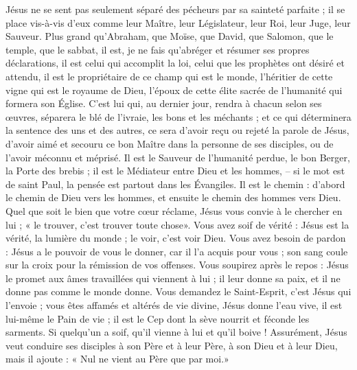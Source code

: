 Jésus ne se sent pas seulement séparé des pécheurs par sa sainteté parfaite ; il se place vis-à-vis d’eux comme leur Maître, leur Législateur, leur Roi, leur Juge, leur Sauveur. Plus grand qu’Abraham, que Moïse, que David, que Salomon, que le temple, que le sabbat, il est, je ne fais qu’abréger et résumer ses propres déclarations, il est celui qui accomplit la loi, celui que les prophètes ont désiré et attendu, il est le propriétaire de ce champ qui est le monde, l’héritier de cette vigne qui est le royaume de Dieu, l’époux de cette élite sacrée de l’humanité qui formera son Église. C’est lui qui, au dernier jour, rendra à chacun selon ses œuvres, séparera le blé de l’ivraie, les bons et les méchants ; et ce qui déterminera la sentence des uns et des autres, ce sera d’avoir reçu ou rejeté la parole de Jésus, d’avoir aimé et secouru ce bon Maître dans la personne de ses disciples, ou de l’avoir méconnu et méprisé. Il est le Sauveur de l’humanité perdue, le bon Berger, la Porte des brebis ; il est le Médiateur entre Dieu et les hommes, – si le mot est de saint Paul, la pensée est partout dans les Évangiles. Il est le chemin : d’abord le chemin de Dieu vers les hommes, et ensuite le chemin des hommes vers Dieu. Quel que soit le bien que votre cœur réclame, Jésus vous convie à le chercher en lui ; « le trouver, c’est trouver toute chose». Vous avez soif de vérité : Jésus est la vérité, la lumière du monde ; le voir, c’est voir Dieu. Vous avez besoin de pardon : Jésus a le pouvoir de vous le donner, car il l’a acquis pour vous ; son sang coule sur la croix pour la rémission de vos offenses. Vous soupirez après le repos : Jésus le promet aux âmes travaillées qui viennent à lui ; il leur donne sa paix, et il ne donne pas comme le monde donne. Vous demandez le Saint-Esprit, c’est Jésus qui l’envoie ; vous êtes affamés et altérés de vie divine, Jésus donne l’eau vive, il est lui-même le Pain de vie ; il est le Cep dont la sève nourrit et féconde les sarments. Si quelqu’un a soif, qu’il vienne à lui et qu’il boive ! Assurément, Jésus veut conduire ses disciples à son Père et à leur Père, à son Dieu et à leur Dieu, mais il ajoute : « Nul ne vient au Père que par moi.»

